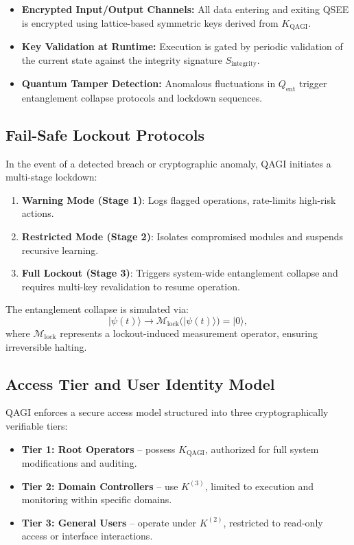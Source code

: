 \documentclass{article}
\theoremstyle{plain}
\theoremstyle{claimstyle}
\begin{document}
\begin{itemize}
    \item \textbf{Encrypted Input/Output Channels:} All data entering and exiting QSEE is encrypted using lattice-based symmetric keys derived from \( K_{\text{QAGI}} \).
    \item \textbf{Key Validation at Runtime:} Execution is gated by periodic validation of the current state against the integrity signature \( S_{\text{integrity}} \).
    \item \textbf{Quantum Tamper Detection:} Anomalous fluctuations in \( Q_{\text{ent}} \) trigger entanglement collapse protocols and lockdown sequences.
\end{itemize}

\subsection{Fail-Safe Lockout Protocols}

In the event of a detected breach or cryptographic anomaly, QAGI initiates a multi-stage lockdown:

\begin{enumerate}
    \item \textbf{Warning Mode (Stage 1)}: Logs flagged operations, rate-limits high-risk actions.
    \item \textbf{Restricted Mode (Stage 2)}: Isolates compromised modules and suspends recursive learning.
    \item \textbf{Full Lockout (Stage 3)}: Triggers system-wide entanglement collapse and requires multi-key revalidation to resume operation.
\end{enumerate}

The entanglement collapse is simulated via:
\begin{equation}
|\psi(t)\rangle \rightarrow \mathcal{M}_{\text{lock}}(|\psi(t)\rangle) = |0\rangle,
\end{equation}
where \( \mathcal{M}_{\text{lock}} \) represents a lockout-induced measurement operator, ensuring irreversible halting.

\subsection{Access Tier and User Identity Model}

QAGI enforces a secure access model structured into three cryptographically verifiable tiers:
\begin{itemize}
    \item \textbf{Tier 1: Root Operators} – possess \( K_{\text{QAGI}} \), authorized for full system modifications and auditing.
    \item \textbf{Tier 2: Domain Controllers} – use \( K^{(3)} \), limited to execution and monitoring within specific domains.
    \item \textbf{Tier 3: General Users} – operate under \( K^{(2)} \), restricted to read-only access or interface interactions.
\end{itemize}
\end{document}
